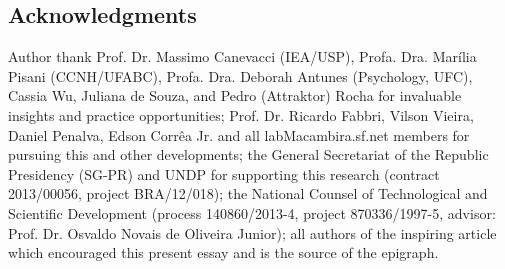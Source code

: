 \documentclass[a4paper, 11pt]{article} %
\newcommand{\aab}{\textsc{aa}}
\newcommand{\aai}{\textsc{Aa}}
\newcommand{\ontologiaa}{\textsc{o}ntologi\textsc{aa}}
\begin{document}
\subsection*{Acknowledgments}
Author thank Prof. Dr. Massimo Canevacci (IEA/USP), Profa. Dra. Marília Pisani (CCNH/UFABC), 
Profa. Dra. Deborah Antunes (Psychology, UFC), Cassia Wu, Juliana de Souza, and Pedro (Attraktor) Rocha for invaluable insights
and practice opportunities; Prof. Dr. Ricardo Fabbri, Vilson Vieira, Daniel Penalva, Edson Corrêa Jr. and all
labMacambira.sf.net members for pursuing this and other developments;
the General Secretariat of the Republic Presidency (SG-PR) and UNDP for supporting this
research (contract 2013/00056, project BRA/12/018); the National Counsel of Technological 
and Scientific Development (process 140860/2013-4, project 870336/1997-5,
advisor: Prof. Dr. Osvaldo Novais de Oliveira Junior);
all authors of the inspiring article~\cite{life} which encouraged this present essay
and is the source of the epigraph.













%
%



\end{document}
